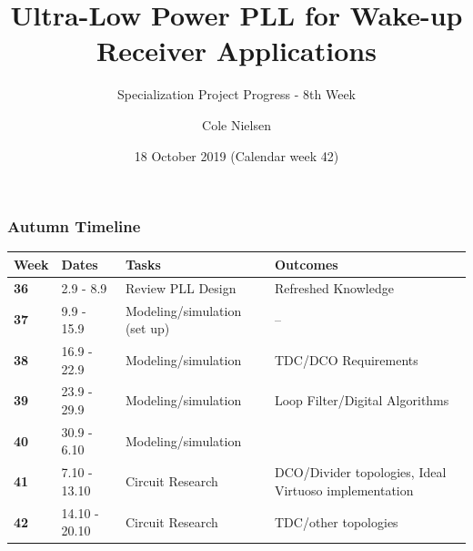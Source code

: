 \documentclass[t, screen, aspectratio=43]{beamer}
\title[Short title]{Ultra-Low Power PLL for Wake-up Receiver Applications}
\subtitle{Specialization Project Progress - 8th Week}
\author[C Nielsen]{Cole Nielsen}
\institute[NTNU]{Department of Electronic Systems, NTNU}
\date{18 October 2019 (Calendar week 42)}
\begin{document}
\begin{frame}
	\titlepage%
\end{frame}


\begin{frame}
	\frametitle{Autumn Timeline}
	\begin{table}[htb!]
		\tiny
		\centering
		\vspace{-1em}
		\def\arraystretch{1.5}		
		\setlength\arrayrulewidth{0.75pt}
		\setlength{\tabcolsep}{1em} %
		\begin{tabular}{|l|l|l|l|}
			\hline 
			\rule[-1ex]{0pt}{2.5ex} \cellcolor{gray!40}\textbf{Week} & \cellcolor{gray!40}\textbf{Dates} &\cellcolor{gray!40}\textbf{Tasks} & \cellcolor{gray!40}\textbf{Outcomes}\\ 
			\hline 
			\rule[-1ex]{0pt}{2.5ex} \cellcolor{red!20}\textbf{36}& \cellcolor{red!20}2.9 - 8.9 & \cellcolor{red!20}Review PLL Design & \cellcolor{red!20}Refreshed Knowledge\\ 
			\hline 
			\rule[-1ex]{0pt}{2.5ex} \cellcolor{red!20}\textbf{37}& \cellcolor{red!20}9.9 - 15.9 & \cellcolor{red!20}Modeling/simulation (set up) & \cellcolor{red!20}--\\ 
			\hline 
			\rule[-1ex]{0pt}{2.5ex} \cellcolor{red!20}\textbf{38}& \cellcolor{red!20}16.9 - 22.9 & \cellcolor{red!20}Modeling/simulation &\cellcolor{red!20}TDC/DCO Requirements\\ 
			\hline 
			\rule[-1ex]{0pt}{2.5ex} \cellcolor{red!20}\textbf{39}& \cellcolor{red!20}23.9 - 29.9& \cellcolor{red!20}Modeling/simulation& \cellcolor{red!20}Loop Filter/Digital Algorithms\\ 
			\hline 
			\rule[-1ex]{0pt}{2.5ex} \cellcolor{red!20}\textbf{40}& \cellcolor{red!20}30.9 - 6.10& \cellcolor{red!20}Modeling/simulation& \cellcolor{red!20}{Loop filter, DCO, TDC, calibration}\color{black}\\ 
			\hline 
			\rule[-1ex]{0pt}{2.5ex} \cellcolor{red!20}\textbf{41}&\cellcolor{red!20}7.10 - 13.10&\cellcolor{red!20}Circuit Research &\cellcolor{red!20}DCO/Divider topologies, Ideal Virtuoso implementation\\ 
			\hline 
			\rule[-1ex]{0pt}{2.5ex} \cellcolor{green!20}\textbf{42}&\cellcolor{green!20}14.10 - 20.10&\cellcolor{green!20}Circuit Research &\cellcolor{green!20}TDC/other topologies\\ 

\end{tabular}
\end{table}
\end{frame}
\end{document}
